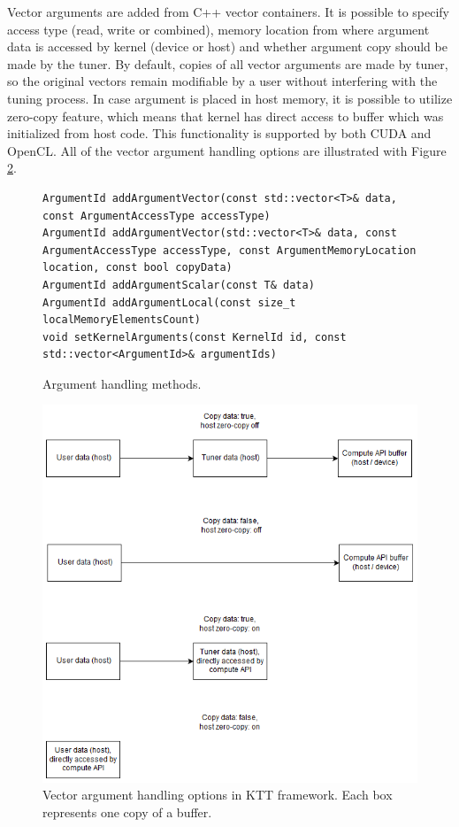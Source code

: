 \documentclass
[
    digital, %
    oneside, %
    table, %
    nolof, %
    nolot, %
    nocover %
]{fithesis3}
\begin{document}
Vector arguments are added from C++ vector containers. It is possible to specify access type (read, write or combined), memory location from where
argument data is accessed by kernel (device or host) and whether argument copy should be made by the tuner. By default, copies of all vector arguments
are made by tuner, so the original vectors remain modifiable by a user without interfering with the tuning process. In case argument is placed in host
memory, it is possible to utilize zero-copy feature, which means that kernel has direct access to buffer which was initialized from host code. This
functionality is supported by both CUDA and OpenCL. All of the vector argument handling options are illustrated with Figure \ref{ktt-buffer-diagram}.

\begin{figure}
\begin{adjustwidth}{-1cm}{-1cm}
\begin{lstlisting}
ArgumentId addArgumentVector(const std::vector<T>& data, const ArgumentAccessType accessType)
ArgumentId addArgumentVector(std::vector<T>& data, const ArgumentAccessType accessType, const ArgumentMemoryLocation location, const bool copyData)
ArgumentId addArgumentScalar(const T& data)
ArgumentId addArgumentLocal(const size_t localMemoryElementsCount)
void setKernelArguments(const KernelId id, const std::vector<ArgumentId>& argumentIds)
\end{lstlisting}
\caption{Argument handling methods.}
\label{ktt-argument-methods}
\end{adjustwidth}
\end{figure}

\begin{figure}
\begin{center}
\includegraphics[width=125mm]{resources/ktt_buffer_diagram.png}
\end{center}
\caption{Vector argument handling options in KTT framework. Each box represents one copy of a buffer.}
\label{ktt-buffer-diagram}
\end{figure}
\end{document}
